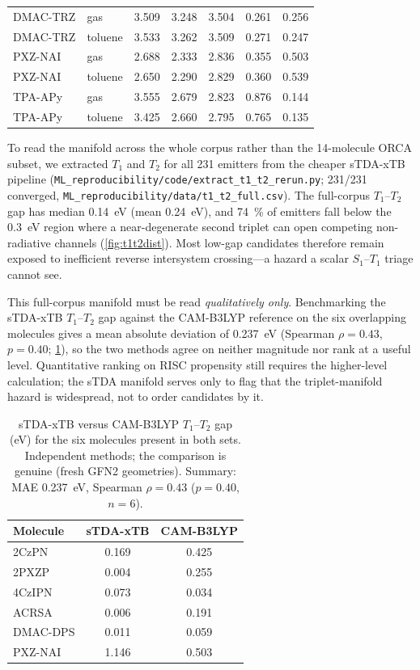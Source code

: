 \documentclass[twoside,twocolumn,9pt]{extarticle}
\begin{document}
\begin{table}[htbp]
\begin{tabular}{llccccc}
    DMAC-TRZ & gas & 3.509 & 3.248 & 3.504 & 0.261 & 0.256 \\
    DMAC-TRZ & toluene & 3.533 & 3.262 & 3.509 & 0.271 & 0.247 \\
    PXZ-NAI & gas & 2.688 & 2.333 & 2.836 & 0.355 & 0.503 \\
    PXZ-NAI & toluene & 2.650 & 2.290 & 2.829 & 0.360 & 0.539 \\
    TPA-APy & gas & 3.555 & 2.679 & 2.823 & 0.876 & 0.144 \\
    TPA-APy & toluene & 3.425 & 2.660 & 2.795 & 0.765 & 0.135 \\
    \bottomrule
  \end{tabular}
\end{table}

To read the manifold across the whole corpus rather than the \num{14}-molecule ORCA
subset, we extracted $T_1$ and $T_2$ for all \num{231} emitters from the cheaper
sTDA-xTB pipeline (\texttt{ML\_reproducibility/code/extract\_t1\_t2\_rerun.py}; \num{231}/\num{231}
converged, \texttt{ML\_reproducibility/data/t1\_t2\_full.csv}). The full-corpus $T_1$--$T_2$ gap has median
\qty{0.14}{\electronvolt} (mean \qty{0.24}{\electronvolt}), and \qty{74}{\percent} of
emitters fall below the \qty{0.3}{\electronvolt} region where a near-degenerate second
triplet can open competing non-radiative channels (\cref{fig:t1t2dist}). Most
low-gap candidates therefore remain exposed to inefficient reverse intersystem
crossing---a hazard a scalar $S_1$--$T_1$ triage cannot see.

This full-corpus manifold must be read \emph{qualitatively only}. Benchmarking the
sTDA-xTB $T_1$--$T_2$ gap against the CAM-B3LYP reference on the six overlapping
molecules gives a mean absolute deviation of \qty{0.237}{\electronvolt}
(Spearman $\rho = 0.43$, $p = 0.40$; \cref{tab:manifold_val}), so the two methods agree
on neither magnitude nor rank at a useful level. Quantitative ranking on RISC propensity
still requires the higher-level calculation; the sTDA manifold serves only to flag that
the triplet-manifold hazard is widespread, not to order candidates by it.

\begin{table}[htbp]
  \centering
  \caption{sTDA-xTB versus CAM-B3LYP $T_1$--$T_2$ gap (eV) for the six molecules present
    in both sets. Independent methods; the comparison is genuine (fresh GFN2 geometries).
    Summary: MAE \qty{0.237}{\electronvolt}, Spearman $\rho = 0.43$ ($p = 0.40$, $n = 6$).}
  \label{tab:manifold_val}
  \small
  \begin{tabular}{lcc}
    \toprule
    Molecule & sTDA-xTB & CAM-B3LYP \\
    \midrule
    2CzPN    & 0.169 & 0.425 \\
    2PXZP    & 0.004 & 0.255 \\
    4CzIPN   & 0.073 & 0.034 \\
    ACRSA    & 0.006 & 0.191 \\
    DMAC-DPS & 0.011 & 0.059 \\
    PXZ-NAI  & 1.146 & 0.503 \\
    \bottomrule
  \end{tabular}
\end{table}
\end{document}
